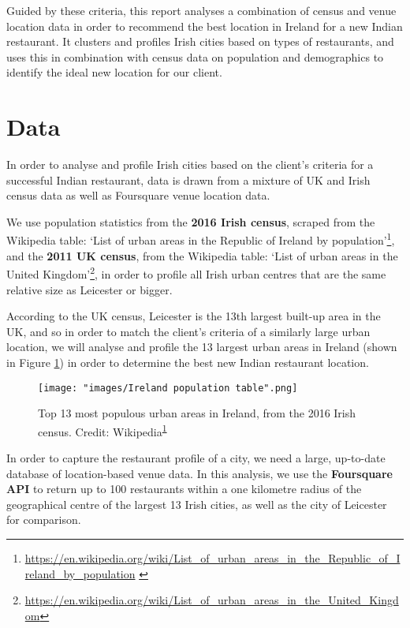 \documentclass[a4paper,11pt]{article}
\begin{document}
Guided by these criteria, this report analyses a combination of census and venue location data in order to recommend the best location in Ireland for a new Indian restaurant. It clusters and profiles Irish cities based on types of restaurants, and uses this in combination with census data on population and demographics to identify the ideal new location for our client.

\section{Data}
In order to analyse and profile Irish cities based on the client's criteria for a successful Indian restaurant, data is drawn from a mixture of UK and Irish census data as well as Foursquare venue location data.

We use population statistics from the \textbf{2016 Irish census}, scraped from the Wikipedia table: `List of urban areas in the Republic of Ireland by population'\footnote{\url{https://en.wikipedia.org/wiki/List_of_urban_areas_in_the_Republic_of_Ireland_by_population} \label{footnote:irish pop}}, and the \textbf{2011 UK census}, from the Wikipedia table: `List of urban areas in the United Kingdom'\footnote{\url{https://en.wikipedia.org/wiki/List_of_urban_areas_in_the_United_Kingdom}}, in order to profile all Irish urban centres that are the same relative size as Leicester or bigger.

According to the UK census, Leicester is the 13th largest built-up area in the UK, and so in order to match the client's criteria of a similarly large urban location, we will analyse and profile the 13 largest urban areas in Ireland (shown in Figure \ref{fig:irish pop table}) in order to determine the best new Indian restaurant location.

\begin{figure}[htb]
   \centering
   \texttt{[image: "images/Ireland population table".png]}
      \caption{Top 13 most populous urban areas in Ireland, from the 2016 Irish census. Credit: Wikipedia\textsuperscript{\ref{footnote:irish pop}}}
      \label{fig:irish pop table}
\end{figure}


In order to capture the restaurant profile of a city, we need a large, up-to-date database of location-based venue data. In this analysis, we use the \textbf{Foursquare API} to return up to 100 restaurants within a one kilometre radius of the geographical centre of the largest 13 Irish cities, as well as the city of Leicester for comparison. 
\end{document}
